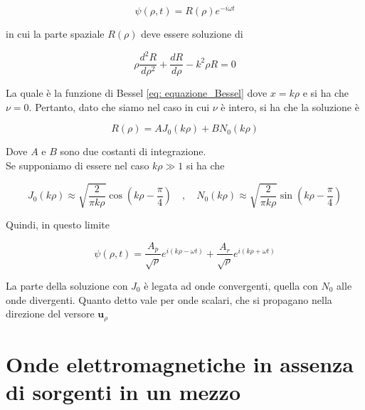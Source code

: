 \begin{equation}
    \psi(\rho,t) = R(\rho) e^{-i \omega t}
\end{equation}

in cui la parte spaziale $R(\rho)$ deve essere soluzione di 

\begin{equation}
    \rho \frac{d^2 R}{d \rho^2} + \frac{dR}{d\rho} - k^2 \rho R = 0
\end{equation}

La quale è la funzione di Bessel \eqref{eq: equazione_Bessel} dove $x = k\rho$ e si ha che $\nu = 0$. Pertanto, dato che siamo nel caso in cui $\nu$ è intero, si ha che la soluzione è 

\begin{equation}
        R(\rho) = A J_{0}(k\rho) + B N_{0} (k\rho)
\end{equation}

Dove $A$ e $B$ sono due costanti di integrazione. \\

Se supponiamo di essere nel caso $k \rho \gg 1$ si ha che 

\begin{tcolorbox}[colback=yellow!10!white, colframe=orange!70!black, boxrule=0.8pt]
\begin{equation}
    J_0(k \rho) \approx \sqrt{\frac{2}{\pi k \rho}} \cos \left(k \rho - \frac{\pi}{4}\right) \quad , \quad N_{0}(k \rho) \approx \sqrt{\frac{2}{\pi k \rho}} \sin\left(k \rho - \frac{\pi}{4}\right)
\end{equation}
\end{tcolorbox}

Quindi, in questo limite 

\begin{tcolorbox}[colback=yellow!10!white, colframe=orange!70!black, boxrule=0.8pt]
\begin{equation}
\psi (\rho, t) = \frac{A_p}{\sqrt{\rho}} e^{i(k\rho - \omega t)} + \frac{A_r}{\sqrt{\rho}} e^{i(k \rho + \omega t)}
\end{equation}
\end{tcolorbox}

La parte della soluzione con $J_0$ è legata ad onde convergenti, quella con $N_0$ alle onde divergenti. Quanto detto vale per onde scalari, che si propagano nella direzione del versore $\mathbf{u}_{\rho}$

\newpage

\section{Onde elettromagnetiche in assenza di sorgenti in un mezzo}

